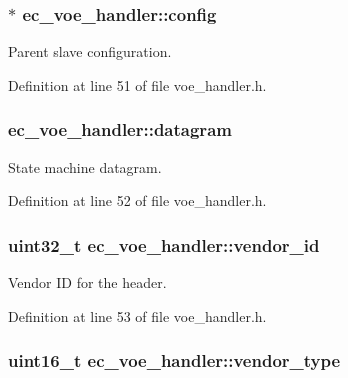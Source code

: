 \subsubsection[{config}]{$\ast$ {\bf ec\-\_\-voe\-\_\-handler\-::config}}\label{structec__voe__handler_a0d54cd53df6b6aa0d3f5d0bdd4d61686}


\-Parent slave configuration. 



\-Definition at line 51 of file voe\-\_\-handler.\-h.

\subsubsection[{datagram}]{ {\bf ec\-\_\-voe\-\_\-handler\-::datagram}}\label{structec__voe__handler_a22dc8e8a089f2a9df8336828d4ddcbe6}


\-State machine datagram. 



\-Definition at line 52 of file voe\-\_\-handler.\-h.

\subsubsection[{vendor\-\_\-id}]{\setlength{\rightskip}{0pt plus 5cm}uint32\-\_\-t {\bf ec\-\_\-voe\-\_\-handler\-::vendor\-\_\-id}}\label{structec__voe__handler_a2c8f52c786041ad0600c3d3b84db48e7}


\-Vendor \-I\-D for the header. 



\-Definition at line 53 of file voe\-\_\-handler.\-h.

\subsubsection[{vendor\-\_\-type}]{\setlength{\rightskip}{0pt plus 5cm}uint16\-\_\-t {\bf ec\-\_\-voe\-\_\-handler\-::vendor\-\_\-type}}\label{structec__voe__handler_aa0f8674c035659f9f2850045ed641139}



